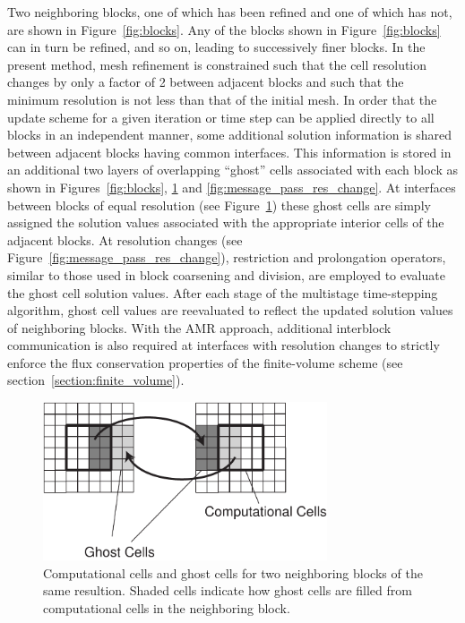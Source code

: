 Two neighboring blocks, one of which has been refined and one of which has not,
are shown in Figure~\ref{fig:blocks}.  Any of the blocks shown in
Figure~\ref{fig:blocks} can in turn be refined, and so on, leading to successively
finer blocks. In the present method, mesh refinement is constrained such that the
cell resolution changes by only a factor of 2 between adjacent blocks and such
that the minimum resolution is not less than that of the initial mesh.
In order that the update scheme for a given iteration or time step can be
applied directly to all blocks in an independent manner, some additional
solution information is shared between adjacent blocks having common
interfaces.  This information is stored in an additional two layers of
overlapping ``ghost'' cells associated with each block  as shown in
Figures~\ref{fig:blocks}, \ref{fig:message_pass_equal} and 
\ref{fig:message_pass_res_change}.  At interfaces between blocks of
equal 
resolution (see Figure~\ref{fig:message_pass_equal}) these
ghost cells are simply assigned the solution values associated with the
appropriate interior cells of the adjacent blocks.  At resolution
changes (see Figure~\ref{fig:message_pass_res_change}),
restriction and prolongation operators, similar to those used in block
coarsening and division, are employed to evaluate the ghost cell solution
values.  After each stage of the multistage time-stepping algorithm, ghost
cell values are reevaluated to reflect the updated solution values of
neighboring blocks.  With the AMR approach, additional interblock
communication is also required at interfaces with resolution changes to
strictly enforce the flux conservation properties of the finite-volume
scheme (see section~\ref{section:finite_volume}).
\begin{figure}
\begin{center}
\includegraphics*[width=8.4cm]{message_pass_equal.pdf}
\end{center}
\caption{Computational cells and ghost cells for two
neighboring blocks of the same resultion.  Shaded cells indicate
how ghost cells are filled from computational cells in the neighboring block.}
\label{fig:message_pass_equal}
\end{figure}
